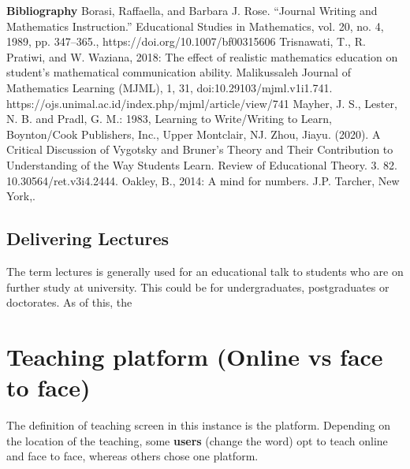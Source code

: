 \documentclass[12pt, a4paper,oneside]{book}
\numberwithin{equation}{section}
\begin{document}

\textbf{Bibliography}
\newline [3] Borasi, Raffaella, and Barbara J. Rose. “Journal Writing and Mathematics Instruction.” Educational Studies in Mathematics, vol. 20, no. 4, 1989, pp. 347–365., https://doi.org/10.1007/bf00315606
\newline [4] Trisnawati, T., R. Pratiwi, and W. Waziana, 2018: The effect of realistic mathematics education on student's mathematical communication ability. Malikussaleh Journal of Mathematics Learning (MJML), 1, 31, doi:10.29103/mjml.v1i1.741. https://ojs.unimal.ac.id/index.php/mjml/article/view/741
\newline [5] Mayher, J. S., Lester, N. B. and Pradl, G. M.: 1983, Learning to Write/Writing to Learn, Boynton/Cook Publishers, Inc., Upper Montclair, NJ.
\newline [6] Zhou, Jiayu. (2020). A Critical Discussion of Vygotsky and Bruner’s Theory and Their Contribution to Understanding of the Way Students Learn. Review of Educational Theory. 3. 82. 10.30564/ret.v3i4.2444.
\newline [7] Oakley, B., 2014: A mind for numbers. J.P. Tarcher, New York,.





\subsection{Delivering Lectures}
The term lectures is generally used for an educational talk to students who are on further study at university. This could be for undergraduates, postgraduates or doctorates. As of this, the

\section{Teaching platform (Online vs face to face)}

The definition of teaching screen in this instance is the platform. Depending on the location of the teaching, some \textbf{users} (change the word) opt to teach online and face to face, whereas others chose one platform.
\end{document}
